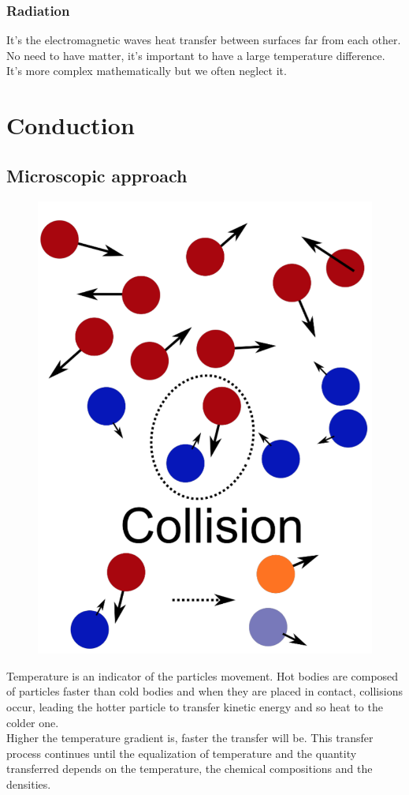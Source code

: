 		\subsubsection{Radiation}
		It's the electromagnetic waves heat transfer between surfaces far from each other. No need to have matter, it's important to have a large temperature difference. It's more complex mathematically but we often neglect it.
		
	\section{Conduction}
		\subsection{Microscopic approach}
			\begin{figure}
 			\vspace{-5mm}
 			\includegraphics[scale=0.2]{ch3/3}
 			\end{figure}
 			Temperature is an indicator of the particles movement. Hot bodies are composed of particles faster than cold bodies and when they are placed in contact, collisions occur, leading the hotter particle to transfer kinetic energy and so heat to the colder one. \\
 			Higher the temperature gradient is, faster the transfer will be. This transfer process continues until the equalization of temperature and the quantity transferred depends on the temperature, the chemical compositions and the densities.
 			
